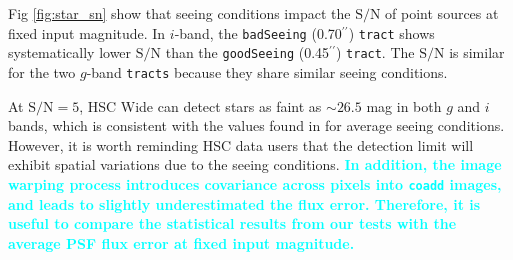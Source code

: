 \documentclass[useamsfonts]{pasj01}
\def\asec{$^{\prime\prime}$}
\def\tract{\texttt{tract}}
\def\tracts{\texttt{tracts}}
\def\s2n{{$\mathrm{S}/\mathrm{N}$}}
\newcommand{\song}[1]{\textcolor{cyan} {\textbf{#1}}}
\begin{document}
    Fig \ref{fig:star_sn} show that seeing conditions impact the \s2n{} of point
    sources at fixed input magnitude.
    In $i$-band, the \texttt{badSeeing} (0.70\asec{}) \tract{} shows systematically
    lower \s2n{} than the \texttt{goodSeeing} (0.45\asec{}) \tract{}.
    The \s2n{} is similar for the two $g$-band \tracts{} because they share similar 
    seeing conditions. 

    At \s2n{}$=5$, HSC Wide can detect stars as faint as ${\sim}26.5$ mag in both $g$ 
    and $i$ bands, which is consistent with the values found in \citet{HSCDR1} for 
    average seeing conditions.
    However, it is worth reminding HSC data users that the detection
    limit will exhibit spatial variations due to the seeing conditions.
    \song{
    In addition, the image warping process introduces covariance across pixels into 
    \texttt{coadd} images, and leads to slightly underestimated the flux error.  
    Therefore, it is useful to compare the statistical results from our tests with the 
    average PSF flux error at fixed input magnitude.  
    }
\end{document}

